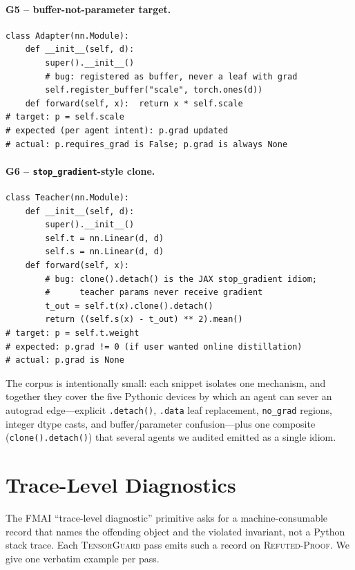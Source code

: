 \documentclass{article}
\begin{document}
\paragraph{G5 -- buffer-not-parameter target.}
\begin{lstlisting}
class Adapter(nn.Module):
    def __init__(self, d):
        super().__init__()
        # bug: registered as buffer, never a leaf with grad
        self.register_buffer("scale", torch.ones(d))
    def forward(self, x):  return x * self.scale
# target: p = self.scale
# expected (per agent intent): p.grad updated
# actual: p.requires_grad is False; p.grad is always None
\end{lstlisting}

\paragraph{G6 -- \texttt{stop\_gradient}-style clone.}
\begin{lstlisting}
class Teacher(nn.Module):
    def __init__(self, d):
        super().__init__()
        self.t = nn.Linear(d, d)
        self.s = nn.Linear(d, d)
    def forward(self, x):
        # bug: clone().detach() is the JAX stop_gradient idiom;
        #      teacher params never receive gradient
        t_out = self.t(x).clone().detach()
        return ((self.s(x) - t_out) ** 2).mean()
# target: p = self.t.weight
# expected: p.grad != 0 (if user wanted online distillation)
# actual: p.grad is None
\end{lstlisting}

The corpus is intentionally small: each snippet isolates one
mechanism, and together they cover the five Pythonic devices by
which an agent can sever an autograd edge---explicit
\texttt{.detach()}, \texttt{.data} leaf replacement,
\texttt{no\_grad} regions, integer dtype casts, and
buffer/parameter confusion---plus one composite
(\texttt{clone().detach()}) that several agents we audited
emitted as a single idiom.

\section{Trace-Level Diagnostics}
\label{sec:diagnostics}

The FMAI ``trace-level diagnostic'' primitive asks for a
machine-consumable record that names the offending object and
the violated invariant, not a Python stack trace. Each
\textsc{TensorGuard} pass emits such a record on
\textsc{Refuted-Proof}. We give one verbatim example per pass.
\end{document}
